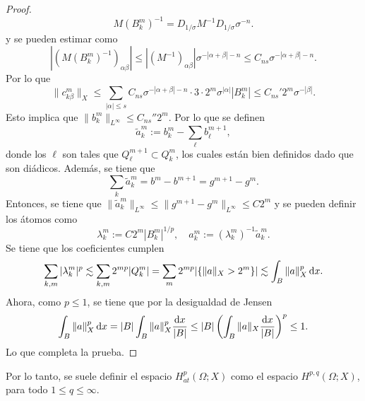 \begin{proof}
	\begin{equation*}
		M({B_k^m})^{-1} = D_{1/\sigma}M^{-1}D_{1/\sigma}\sigma^{-n}.
	\end{equation*}
	y se pueden estimar como 
	\begin{equation*}
		|(M({B_k^m})^{-1})_{\alpha\beta} | \leq |(M^{-1})_{\alpha\beta}| \sigma^{-|\alpha+\beta|-n} \leq C_{ns}\sigma^{-|\alpha+\beta|-n}.
	\end{equation*}
	Por lo que 
	\begin{equation*}
		\|c_{k\beta}^m\|_X\leq \sum_{|\alpha|\leq s} C_{ns}\sigma^{-|\alpha+\beta|-n} \cdot 3\cdot2^m\sigma^{|\alpha|}|{B_k^m}| \leq C_{ns}' 2^m\sigma^{-|\beta|}.
	\end{equation*}
	Esto implica que $\|b_k^m\|_{L^\infty} \leq C_{ns}'' 2^m$. Por lo que se definen 
	\begin{equation*}
		\tilde{a}_k^m := b_k^m - \sum_\ell b_\ell^{m+1}, 
	\end{equation*}
	donde los $\ell$ son tales que $Q_\ell^{m+1} \subset Q_k^m$, los cuales están bien definidos dado que son diádicos. Además, se tiene que 
	\begin{equation*}
		 \sum_k \tilde{a}_k^m = b^m - b^{m+1} = g^{m+1 }- g^m.
	\end{equation*} 
	Entonces, se tiene que $\|\tilde{a}_k^m\|_{L^\infty} \leq \|g^{m+1 }- g^m\|_{L^\infty} \leq C 2^m$ y se pueden definir los átomos como
	\begin{equation*}
		\lambda_k^m := C2^m|B_k^m|^{1/p}, \quad a_k^m := (\lambda_k^m)^{-1}\tilde{a}_k^m.
	\end{equation*} 
	Se tiene que los coeficientes cumplen 
	\begin{equation*}
		\sum_{k,m}|\lambda_k^m|^p \lesssim \sum_{k,m} 2^{mp}|Q_k^m| = \sum_m 2^{mp}|\{\|a\|_X > 2^m\}|\lesssim \int_B \|a\|_X^p \mathop{}\!\mathrm{d} x.
	\end{equation*}
	Ahora, como $p\leq 1$, se tiene que por la desigualdad de Jensen
	\begin{equation*}
		\int_B \|a\|_X^p \mathop{}\!\mathrm{d} x = |B|\int_B \|a\|_X^p \frac{\mathop{}\!\mathrm{d} x}{|B|} \leq |B| \left(\int_B \|a\|_X \frac{\mathop{}\!\mathrm{d} x}{|B|} \right)^p \leq 1.
	\end{equation*}
	Lo que completa la prueba.
\end{proof}
\begin{remark}
	Por lo tanto, se suele definir el espacio $H^p_{at}(\Omega;X)$ como el espacio $H^{p,q}(\Omega;X)$, para todo $1\leq q \leq \infty$.
\end{remark}
